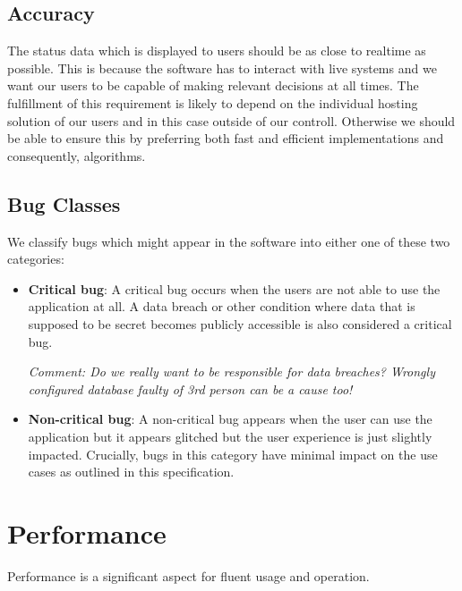 \documentclass[a4paper,12pt,chapterprefix=false,bibliography=totoc,listof=totoc,]{scrreprt}
\begin{document}
\subsection{Accuracy}
The status data which is displayed to users should be as close to realtime as possible. This is because the software has to interact with live systems and we want our users to be capable of making relevant decisions at all times. The fulfillment of this requirement is likely to depend on the individual hosting solution of our users and in this case outside of our controll. Otherwise we should be able to ensure this by preferring both fast and efficient implementations and consequently, algorithms.

\subsection{Bug Classes}
We classify bugs which might appear in the software into either one of these two categories:

\begin{itemize}
    \item {\color{magenta}\textbf{Critical bug}: A critical bug occurs when the users are not able to use the application at all. A data breach or other condition where data that is supposed to be secret becomes publicly accessible is also considered a critical bug.
    	
    	\emph{Comment: Do we really want to be responsible for data breaches? Wrongly configured database faulty of 3rd person can be a cause too!}
    }
    \item \textbf{Non-critical bug}: A non-critical bug appears when the user can use the application but it appears glitched but the user experience is just slightly impacted. Crucially, bugs in this category have minimal impact on the use cases as outlined in this specification.
\end{itemize}

\section{Performance}
Performance is a significant aspect for fluent usage and operation.
\end{document}
